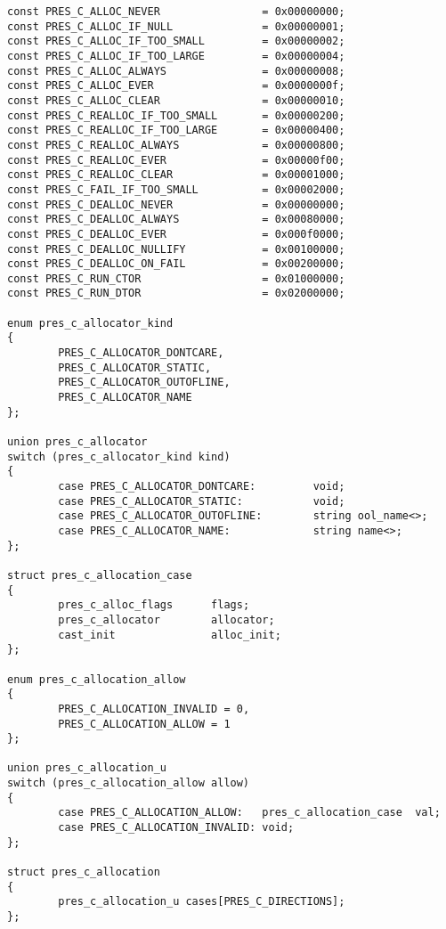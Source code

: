 \begin{verbatim}
const PRES_C_ALLOC_NEVER                = 0x00000000;
const PRES_C_ALLOC_IF_NULL              = 0x00000001;
const PRES_C_ALLOC_IF_TOO_SMALL         = 0x00000002;
const PRES_C_ALLOC_IF_TOO_LARGE         = 0x00000004;
const PRES_C_ALLOC_ALWAYS               = 0x00000008;
const PRES_C_ALLOC_EVER                 = 0x0000000f;
const PRES_C_ALLOC_CLEAR                = 0x00000010;
const PRES_C_REALLOC_IF_TOO_SMALL       = 0x00000200;
const PRES_C_REALLOC_IF_TOO_LARGE       = 0x00000400;
const PRES_C_REALLOC_ALWAYS             = 0x00000800;
const PRES_C_REALLOC_EVER               = 0x00000f00;
const PRES_C_REALLOC_CLEAR              = 0x00001000;
const PRES_C_FAIL_IF_TOO_SMALL          = 0x00002000;
const PRES_C_DEALLOC_NEVER              = 0x00000000;
const PRES_C_DEALLOC_ALWAYS             = 0x00080000;
const PRES_C_DEALLOC_EVER               = 0x000f0000;
const PRES_C_DEALLOC_NULLIFY            = 0x00100000;
const PRES_C_DEALLOC_ON_FAIL            = 0x00200000;
const PRES_C_RUN_CTOR                   = 0x01000000;
const PRES_C_RUN_DTOR                   = 0x02000000;

enum pres_c_allocator_kind
{
        PRES_C_ALLOCATOR_DONTCARE,
        PRES_C_ALLOCATOR_STATIC,
        PRES_C_ALLOCATOR_OUTOFLINE,
        PRES_C_ALLOCATOR_NAME
};

union pres_c_allocator
switch (pres_c_allocator_kind kind)
{
        case PRES_C_ALLOCATOR_DONTCARE:         void;
        case PRES_C_ALLOCATOR_STATIC:           void;
        case PRES_C_ALLOCATOR_OUTOFLINE:        string ool_name<>;
        case PRES_C_ALLOCATOR_NAME:             string name<>;
};

struct pres_c_allocation_case
{
        pres_c_alloc_flags      flags;
        pres_c_allocator        allocator;
        cast_init               alloc_init;
};

enum pres_c_allocation_allow
{
        PRES_C_ALLOCATION_INVALID = 0,
        PRES_C_ALLOCATION_ALLOW = 1
};

union pres_c_allocation_u
switch (pres_c_allocation_allow allow)
{
        case PRES_C_ALLOCATION_ALLOW:   pres_c_allocation_case  val;
        case PRES_C_ALLOCATION_INVALID: void;
};

struct pres_c_allocation
{
        pres_c_allocation_u cases[PRES_C_DIRECTIONS];
};
\end{verbatim}




